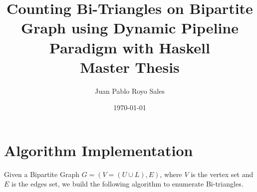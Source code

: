 \documentclass[12pt, a4paper]{article}
\title{%
      Counting Bi-Triangles on Bipartite Graph using Dynamic Pipeline Paradigm with Haskell\\
      Master Thesis
}
\author{Juan Pablo Royo Sales}
\affil{Universitat Politècnica de Catalunya}
\date\today
\begin{document}


\section{Algorithm Implementation}


Given a Bipartite Graph $G = (V = (U \cup L), E)$, where $V$ is the vertex set and 
$E$ is the edges set, we build the following algorithm to enumerate Bi-triangles.
\end{document}
